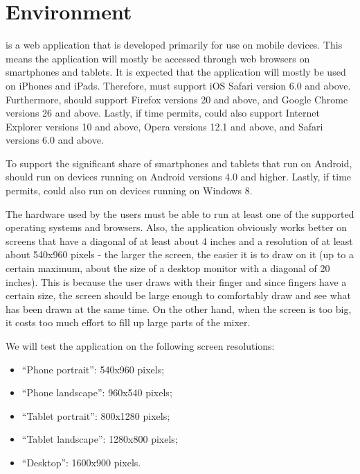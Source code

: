\section{Environment}
\label{sec:env}
\projectname{} is a web application that is developed primarily for use on mobile devices. This means the application will mostly be accessed through web browsers on smartphones and tablets. It is expected that the application will mostly be used on iPhones and iPads. Therefore, \projectname{} must support iOS Safari version 6.0 and above. Furthermore, \projectname{} should support Firefox versions 20 and above, and Google Chrome versions 26 and above. Lastly, if time permits, \projectname{} could also support Internet Explorer versions 10 and above, Opera versions 12.1 and above, and Safari versions 6.0 and above.

To support the significant share of smartphones and tablets that run on Android, \projectname{} should run on devices running on Android versions 4.0 and higher. Lastly, if time permits, \projectname{} could also run on devices running on Windows 8.

The hardware used by the users must be able to run at least one of the supported operating systems and browsers. Also, the application obviously works better on screens that have a diagonal of at least about 4 inches and a resolution of at least about 540x960 pixels - the larger the screen, the easier it is to draw on it (up to a certain maximum, about the size of a desktop monitor with a diagonal of 20 inches). This is because the user draws with their finger and since fingers have a certain size, the screen should be large enough to comfortably draw and see what has been drawn at the same time. On the other hand, when the screen is too big, it costs too much effort to fill up large parts of the mixer.

We will test the application on the following screen resolutions:
\begin{itemize}
	\item ``Phone portrait'': 540x960 pixels;
	\item ``Phone landscape'': 960x540 pixels;
	\item ``Tablet portrait'': 800x1280 pixels;
	\item ``Tablet landscape'': 1280x800 pixels;
	\item ``Desktop'': 1600x900 pixels.
\end{itemize}

